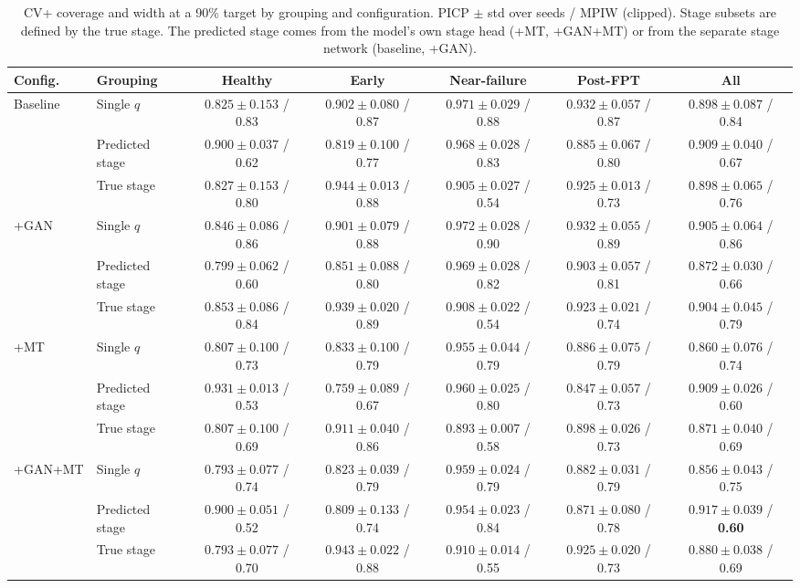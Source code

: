 \documentclass[review]{elsarticle}
\begin{document}
\begin{table}[!htbp]
\centering
\caption{CV+ coverage and width at a 90\% target by grouping and
configuration. PICP $\pm$ std over seeds / MPIW (clipped). Stage
subsets are defined by the true stage. The predicted stage comes from
the model's own stage head (+MT, +GAN+MT) or from the separate stage
network (baseline, +GAN).}
\label{tab:intervals}
\scriptsize
\renewcommand{\arraystretch}{1.2}
\setlength{\tabcolsep}{2.5pt}
\begin{tabular}{llccccc}
\toprule
\textbf{Config.} & \textbf{Grouping} & \textbf{Healthy} & \textbf{Early} &
\textbf{Near-failure} & \textbf{Post-FPT} & \textbf{All} \\
\midrule
\multirow{3}{*}{Baseline}
 & Single $q$      & $0.825 \pm 0.153$ / 0.83 & $0.902 \pm 0.080$ / 0.87 & $0.971 \pm 0.029$ / 0.88 & $0.932 \pm 0.057$ / 0.87 & $0.898 \pm 0.087$ / 0.84 \\
 & Predicted stage & $0.900 \pm 0.037$ / 0.62 & $0.819 \pm 0.100$ / 0.77 & $0.968 \pm 0.028$ / 0.83 & $0.885 \pm 0.067$ / 0.80 & $0.909 \pm 0.040$ / 0.67 \\
 & True stage      & $0.827 \pm 0.153$ / 0.80 & $0.944 \pm 0.013$ / 0.88 & $0.905 \pm 0.027$ / 0.54 & $0.925 \pm 0.013$ / 0.73 & $0.898 \pm 0.065$ / 0.76 \\
\midrule
\multirow{3}{*}{+GAN}
 & Single $q$      & $0.846 \pm 0.086$ / 0.86 & $0.901 \pm 0.079$ / 0.88 & $0.972 \pm 0.028$ / 0.90 & $0.932 \pm 0.055$ / 0.89 & $0.905 \pm 0.064$ / 0.86 \\
 & Predicted stage & $0.799 \pm 0.062$ / 0.60 & $0.851 \pm 0.088$ / 0.80 & $0.969 \pm 0.028$ / 0.82 & $0.903 \pm 0.057$ / 0.81 & $0.872 \pm 0.030$ / 0.66 \\
 & True stage      & $0.853 \pm 0.086$ / 0.84 & $0.939 \pm 0.020$ / 0.89 & $0.908 \pm 0.022$ / 0.54 & $0.923 \pm 0.021$ / 0.74 & $0.904 \pm 0.045$ / 0.79 \\
\midrule
\multirow{3}{*}{+MT}
 & Single $q$      & $0.807 \pm 0.100$ / 0.73 & $0.833 \pm 0.100$ / 0.79 & $0.955 \pm 0.044$ / 0.79 & $0.886 \pm 0.075$ / 0.79 & $0.860 \pm 0.076$ / 0.74 \\
 & Predicted stage & $0.931 \pm 0.013$ / 0.53 & $0.759 \pm 0.089$ / 0.67 & $0.960 \pm 0.025$ / 0.80 & $0.847 \pm 0.057$ / 0.73 & $0.909 \pm 0.026$ / 0.60 \\
 & True stage      & $0.807 \pm 0.100$ / 0.69 & $0.911 \pm 0.040$ / 0.86 & $0.893 \pm 0.007$ / 0.58 & $0.898 \pm 0.026$ / 0.73 & $0.871 \pm 0.040$ / 0.69 \\
\midrule
\multirow{3}{*}{+GAN+MT}
 & Single $q$      & $0.793 \pm 0.077$ / 0.74 & $0.823 \pm 0.039$ / 0.79 & $0.959 \pm 0.024$ / 0.79 & $0.882 \pm 0.031$ / 0.79 & $0.856 \pm 0.043$ / 0.75 \\
 & Predicted stage & $0.900 \pm 0.051$ / 0.52 & $0.809 \pm 0.133$ / 0.74 & $0.954 \pm 0.023$ / 0.84 & $0.871 \pm 0.080$ / 0.78 & $\mathbf{0.917 \pm 0.039}$ / \textbf{0.60} \\
 & True stage      & $0.793 \pm 0.077$ / 0.70 & $0.943 \pm 0.022$ / 0.88 & $0.910 \pm 0.014$ / 0.55 & $0.925 \pm 0.020$ / 0.73 & $0.880 \pm 0.038$ / 0.69 \\
\bottomrule
\end{tabular}
\end{table}
\end{document}
